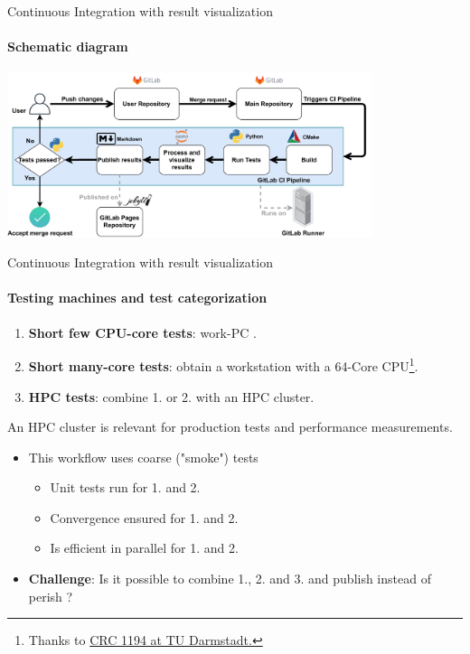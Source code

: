 \documentclass[
	aspectratio=169,%
	color={accentcolor=2d},
	logo=true,%
	colorframetitle=true,%
	]{tudabeamer}
\begin{document}
\begin{frame}{Continuous Integration with result visualization} 
	\framesubtitle{Schematic diagram}

	\centering
	\includegraphics[width=0.8\textwidth]{figures/ZINF-CI-diagram.pdf}

\end{frame}

\begin{frame}{Continuous Integration with result visualization} 
    \framesubtitle{Testing machines and test categorization}

    \vfill
    \begin{enumerate}
        \item \textbf{Short few CPU-core tests}: work-PC \faGraduationCap.    
        \item \textbf{Short many-core tests}: obtain a workstation with a 64-Core CPU\footnote{Thanks to \href{https://www.sfb1194.tu-darmstadt.de/index.en.jsp}{CRC 1194 at TU Darmstadt.}}\faGraduationCap.
        \item \textbf{HPC tests}: combine 1. or 2. with an HPC cluster. 
    \end{enumerate}

    An HPC cluster is relevant for production tests and performance measurements.
    \begin{itemize}
        \item This workflow uses coarse ("smoke") tests \faGraduationCap
            \begin{itemize}
                \item Unit tests run for 1. and 2.
                \item Convergence ensured for 1. and 2.
                \item Is efficient in parallel for 1. and 2. 
            \end{itemize}
        \item \textbf{Challenge}: Is it possible to combine 1., 2. and 3. and publish instead of perish \faGraduationCap?
    \end{itemize}

\end{frame}
\end{document}
